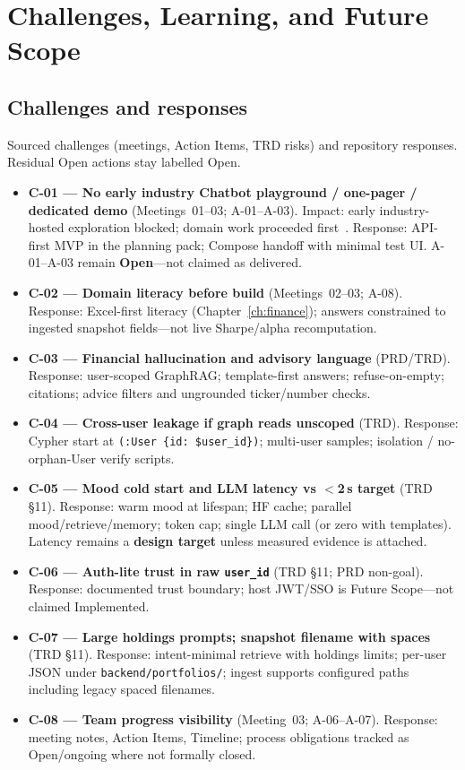 \chapter{Challenges, Learning, and Future Scope}
\label{ch:challenges}
\label{ch:learning}
\label{ch:future}

\section{Challenges and responses}

Sourced challenges (meetings, Action Items, TRD risks) and repository responses. Residual Open actions stay labelled Open.

\begin{itemize}[leftmargin=*]
  \item \textbf{C-01 --- No early industry Chatbot playground / one-pager / dedicated demo} (Meetings~01--03; A-01--A-03). Impact: early industry-hosted exploration blocked; domain work proceeded first~\cite{readme}. Response: API-first MVP in the planning pack; Compose handoff with minimal test UI. A-01--A-03 remain \textbf{Open}---not claimed as delivered.
  \item \textbf{C-02 --- Domain literacy before build} (Meetings~02--03; A-08). Response: Excel-first literacy (Chapter~\ref{ch:finance}); answers constrained to ingested snapshot fields---not live Sharpe/alpha recomputation.
  \item \textbf{C-03 --- Financial hallucination and advisory language} (PRD/TRD). Response: user-scoped GraphRAG; template-first answers; refuse-on-empty; citations; advice filters and ungrounded ticker/number checks.
  \item \textbf{C-04 --- Cross-user leakage if graph reads unscoped} (TRD). Response: Cypher start at \texttt{(:User \{id: \$user\_id\})}; multi-user samples; isolation / no-orphan-User verify scripts.
  \item \textbf{C-05 --- Mood cold start and LLM latency vs $<$2\,s target} (TRD §11). Response: warm mood at lifespan; HF cache; parallel mood/retrieve/memory; token cap; single LLM call (or zero with templates). Latency remains a \textbf{design target} unless measured evidence is attached.
  \item \textbf{C-06 --- Auth-lite trust in raw \texttt{user\_id}} (TRD §11; PRD non-goal). Response: documented trust boundary; host JWT/SSO is Future Scope---not claimed Implemented.
  \item \textbf{C-07 --- Large holdings prompts; snapshot filename with spaces} (TRD §11). Response: intent-minimal retrieve with holdings limits; per-user JSON under \texttt{backend/portfolios/}; ingest supports configured paths including legacy spaced filenames.
  \item \textbf{C-08 --- Team progress visibility} (Meeting~03; A-06--A-07). Response: meeting notes, Action Items, Timeline; process obligations tracked as Open/ongoing where not formally closed.
\end{itemize}

